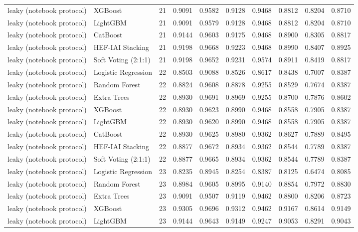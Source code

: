 \begin{tabular}{llrrrrrrrr}
leaky (notebook protocol) & XGBoost & 21 & 0.9091 & 0.9582 & 0.9128 & 0.9468 & 0.8812 & 0.8204 & 0.8710 \\
leaky (notebook protocol) & LightGBM & 21 & 0.9091 & 0.9579 & 0.9128 & 0.9468 & 0.8812 & 0.8204 & 0.8710 \\
leaky (notebook protocol) & CatBoost & 21 & 0.9144 & 0.9603 & 0.9175 & 0.9468 & 0.8900 & 0.8305 & 0.8817 \\
leaky (notebook protocol) & HEF-IAI Stacking & 21 & 0.9198 & 0.9668 & 0.9223 & 0.9468 & 0.8990 & 0.8407 & 0.8925 \\
leaky (notebook protocol) & Soft Voting (2:1:1) & 21 & 0.9198 & 0.9652 & 0.9231 & 0.9574 & 0.8911 & 0.8419 & 0.8817 \\
leaky (notebook protocol) & Logistic Regression & 22 & 0.8503 & 0.9088 & 0.8526 & 0.8617 & 0.8438 & 0.7007 & 0.8387 \\
leaky (notebook protocol) & Random Forest & 22 & 0.8824 & 0.9608 & 0.8878 & 0.9255 & 0.8529 & 0.7674 & 0.8387 \\
leaky (notebook protocol) & Extra Trees & 22 & 0.8930 & 0.9691 & 0.8969 & 0.9255 & 0.8700 & 0.7876 & 0.8602 \\
leaky (notebook protocol) & XGBoost & 22 & 0.8930 & 0.9623 & 0.8990 & 0.9468 & 0.8558 & 0.7905 & 0.8387 \\
leaky (notebook protocol) & LightGBM & 22 & 0.8930 & 0.9620 & 0.8990 & 0.9468 & 0.8558 & 0.7905 & 0.8387 \\
leaky (notebook protocol) & CatBoost & 22 & 0.8930 & 0.9625 & 0.8980 & 0.9362 & 0.8627 & 0.7889 & 0.8495 \\
leaky (notebook protocol) & HEF-IAI Stacking & 22 & 0.8877 & 0.9672 & 0.8934 & 0.9362 & 0.8544 & 0.7789 & 0.8387 \\
leaky (notebook protocol) & Soft Voting (2:1:1) & 22 & 0.8877 & 0.9665 & 0.8934 & 0.9362 & 0.8544 & 0.7789 & 0.8387 \\
leaky (notebook protocol) & Logistic Regression & 23 & 0.8235 & 0.8945 & 0.8254 & 0.8387 & 0.8125 & 0.6474 & 0.8085 \\
leaky (notebook protocol) & Random Forest & 23 & 0.8984 & 0.9605 & 0.8995 & 0.9140 & 0.8854 & 0.7972 & 0.8830 \\
leaky (notebook protocol) & Extra Trees & 23 & 0.9091 & 0.9507 & 0.9119 & 0.9462 & 0.8800 & 0.8206 & 0.8723 \\
leaky (notebook protocol) & XGBoost & 23 & 0.9305 & 0.9696 & 0.9312 & 0.9462 & 0.9167 & 0.8614 & 0.9149 \\
leaky (notebook protocol) & LightGBM & 23 & 0.9144 & 0.9643 & 0.9149 & 0.9247 & 0.9053 & 0.8291 & 0.9043 \\

\end{tabular}
